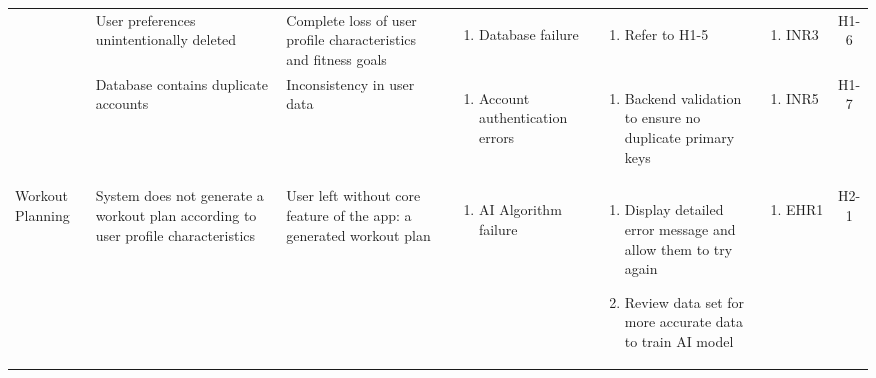 \documentclass{article}
\begin{document}
\begin{longtable}{|p{1.7cm}|p{1.7cm} p{2.4cm} p{2.4cm} p{3.5cm} p{1.6cm} c|}
        \cline{2-7}
        & User preferences unintentionally deleted & Complete loss of user profile characteristics and fitness goals & \vspace*{-\baselineskip}\begin{enumerate}[label=\alph*., left=0pt, nosep]\item Database failure \end{enumerate} & \vspace*{-\baselineskip}\begin{enumerate}[label=\alph*., left=0pt, nosep]\item Refer to H1-5 \end{enumerate}& \vspace*{-\baselineskip}\begin{enumerate}[label=\alph*., left=0pt, nosep] \item INR3 \end{enumerate} & H1-6\\
        \cline{2-7}
        & Database contains duplicate accounts & Inconsistency in user data & \vspace*{-\baselineskip}\begin{enumerate}[label=\alph*., left=0pt, nosep]\item Account authentication errors \end{enumerate} & \vspace*{-\baselineskip}\begin{enumerate}[label=\alph*., left=0pt, nosep]\item Backend validation to ensure no duplicate primary keys \end{enumerate}& \vspace*{-\baselineskip}\begin{enumerate}[label=\alph*., left=0pt, nosep] \item INR5 \end{enumerate} & H1-7\\
        \hline
        Workout Planning & System does not generate a workout plan according to user profile characteristics & User left without core feature of the app: a generated workout plan & \vspace*{-\baselineskip}\begin{enumerate}[label=\alph*., left=0pt, nosep]\item AI Algorithm failure \end{enumerate} & \vspace*{-\baselineskip}\begin{enumerate}[label=\alph*., left=0pt, nosep]\item Display detailed error message and allow them to try again \item Review data set for more accurate data to train AI model \end{enumerate}& \vspace*{-\baselineskip}\begin{enumerate}[label=\alph*., left=0pt, nosep] \item EHR1 \end{enumerate} & H2-1\\

\end{longtable}
\end{document}
